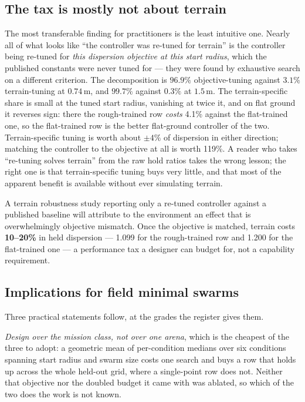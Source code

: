 \documentclass[11pt,a4paper]{article}
\begin{document}
\subsection{The tax is mostly not about terrain}

The most transferable finding for practitioners is the least intuitive one.
Nearly all of what looks like ``the controller was re-tuned for terrain'' is the
controller being re-tuned for \emph{this dispersion objective at this start
radius}, which the published constants were never tuned for --- they were found by
exhaustive search on a different criterion. The decomposition is $96.9\%$
objective-tuning against $3.1\%$ terrain-tuning at $0.74$\,m, and $99.7\%$ against
$0.3\%$ at $1.5$\,m. The terrain-specific share is small at the tuned start
radius, vanishing at twice it, and on flat ground it reverses sign: there the
rough-trained row \emph{costs} 4.1\% against the flat-trained one, so the
flat-trained row is the better flat-ground controller of the two. Terrain-specific
tuning is worth about $\pm 4\%$ of dispersion in either direction; matching the
controller to the objective at all is worth 119\%. A reader who takes ``re-tuning solves terrain'' from the raw hold ratios
takes the wrong lesson; the right one is that terrain-specific tuning buys very
little, and that most of the apparent benefit is available without ever
simulating terrain.

A terrain robustness study reporting only a re-tuned controller against a
published baseline will attribute to the environment an effect that is
overwhelmingly objective mismatch. Once the objective is matched, terrain costs
\textbf{10--20\%} in held dispersion --- 1.099 for the rough-trained row and
1.200 for the flat-trained one --- a performance tax a designer can budget for,
not a capability requirement.

\subsection{Implications for field minimal swarms}

Three practical statements follow, at the grades the register gives them.

\emph{Design over the mission class, not over one arena}, which is the cheapest
of the three to adopt: a geometric mean of per-condition medians over six
conditions spanning start radius and swarm size costs one search and buys a row
that holds up across the whole held-out grid, where a single-point row does not.
Neither that objective nor the doubled budget it came with was ablated, so which
of the two does the work is not known.
\end{document}
